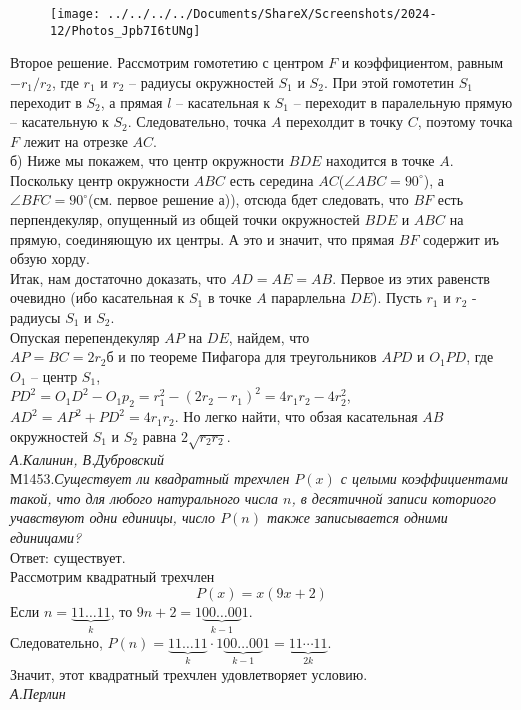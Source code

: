 \documentclass[russian,10pt,a4paper,twocolumn]{article}
\begin{document}
	
\begin{figure}[h]
	\centering
	\texttt{[image: ../../../../Documents/ShareX/Screenshots/2024-12/Photos\_Jpb7I6tUNg]}
\end{figure}
	
	\noindent
	Второе решение. Рассмотрим гомотетию с центром $F$ и коэффициентом, равным $-r_1/r_2$, где $r_1$ и $r_2$ -- радиусы окружностей $S_1$ и $S_2$. При этой гомотетин $S_1$ переходит в $S_2$, а прямая $l$ -- касательная к $S_1$ -- переходит в паралельную прямую -- касательную к $S_2$. Следовательно, точка $A$ перехолдит в точку $C$, поэтому точка $F$ лежит на отрезке $AC$.\\
	б) Ниже мы покажем, что центр окружности $BDE$ находится в точке $A$. Поскольку центр окружности $ABC$ есть середина $AC$($\angle ABC=90^{\circ}$), а $\angle BFC = 90^{\circ}$(см. первое решение а)), отсюда бдет следовать, что $BF$ есть перпендекуляр, опущенный из общей точки окружностей $BDE$ и $ABC$ на прямую, соединяющую их центры. А это и значит, что прямая $BF$ содержит иъ обзую хорду.\\
	Итак, нам достаточно доказать, что $AD=AE=AB$. Первое из этих равенств очевидно (ибо касательная к $S_1$ в точке $A$ парарлельна $DE$). Пусть $r_1$ и $r_2$ - радиусы $S_1$ и $S_2$.\\ Опуская перепендекуляр $AP$ на $DE$, найдем, что\\ $AP=BC=2r_2$б и по теореме Пифагора для треугольников $APD$ и $O_1PD$, где $O_1$ -- центр $S_1$,\\
	$PD^2 = O_1D^2 - O_1p_2 = r_1^2 - (2r_2-r_1)^2=4r_1r_2-4r_2^2$,\\
	$AD^2 = AP^2 +PD^2 = 4r_1r_2$. Но легко найти, что обзая касательная $AB$ окружностей $S_1$ и $S_2$ равна $2\sqrt{r_2r_2}$.\\
	{\slshape А.Калинин, В.Дубровский} \\
	
	\noindent
	М1453.{\slshape Существует ли квадратный трехчлен $P(x)$ с целыми коэффициентами такой, что для любого натурального числа $n$, в десятичной записи коториого учавствуют одни единицы, число $P(n)$ также записывается одними единицами?}\\
	Ответ: существует.\\
	Рассмотрим квадратный трехчлен
	\[
	P(x)=x(9x+2)
	\]
	Если $n = \underbrace{11\ldots11}_k$, то $9n+2=1\underbrace{00\ldots00}_{k-1} 1$.\\
	Следовательно, $P(n)=\underbrace{11\ldots11}_k \cdot 1\underbrace{00\ldots00}_{k-1}1=\underbrace{11\cdots11}_{2k}$.\\
	Значит, этот квадратный трехчлен удовлетворяет условию.\\
	{\slshape А.Перлин}\\
	
\end{document}
